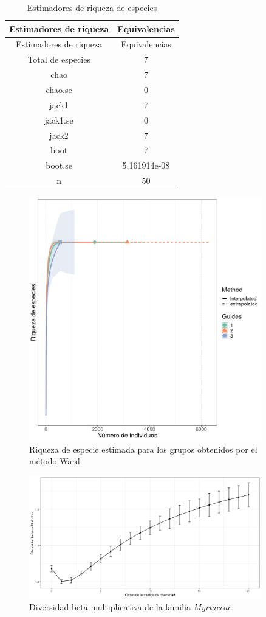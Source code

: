 \documentclass[11pt,]{article}
\begin{document}
\begin{longtable}[]{@{}cc@{}}
\caption{\label{tab:estimadores} Estimadores de riqueza de
especies}\tabularnewline
\toprule
Estimadores de riqueza & Equivalencias\tabularnewline
\midrule
\endfirsthead
\toprule
Estimadores de riqueza & Equivalencias\tabularnewline
\midrule
\endhead
Total de especies & 7\tabularnewline
chao & 7\tabularnewline
chao.se & 0\tabularnewline
jack1 & 7\tabularnewline
jack1.se & 0\tabularnewline
jack2 & 7\tabularnewline
boot & 7\tabularnewline
boot.se & 5.161914e-08\tabularnewline
n & 50\tabularnewline
\bottomrule
\end{longtable}

\begin{figure}
\centering
\includegraphics[width=0.90000\textwidth]{riq_espc_est.png}
\caption{Riqueza de especie estimada para los grupos obtenidos por el
método Ward\label{fig:riq_est}}
\end{figure}

\begin{figure}
\centering
\includegraphics[width=0.90000\textwidth]{div_beta_multi.png}
\caption{Diversidad beta multiplicativa de la familia
\emph{Myrtaceae}\label{fig:beta}}
\end{figure}
\end{document}
